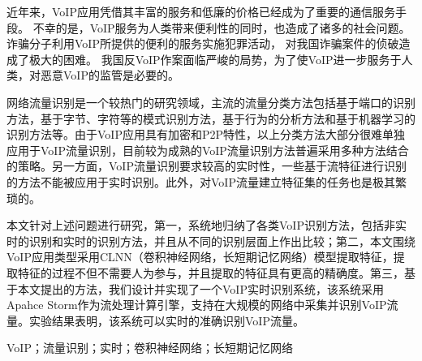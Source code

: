 
\begin{zhaiyao}
近年来，VoIP应用凭借其丰富的服务和低廉的价格已经成为了重要的通信服务手段。
不幸的是，VoIP服务为人类带来便利性的同时，也造成了诸多的社会问题。诈骗分子利用VoIP所提供的便利的服务实施犯罪活动，
对我国诈骗案件的侦破造成了极大的困难。
我国反VoIP作案面临严峻的局势，为了使VoIP进一步服务于人类，对恶意VoIP的监管是必要的。

网络流量识别是一个较热门的研究领域，主流的流量分类方法包括基于端口的识别方法，基于字节、字符等的模式识别方法，基于行为的分析方法和基于机器学习的识别方法等。由于VoIP应用具有加密和P2P特性，以上分类方法大部分很难单独应用于VoIP流量识别，目前较为成熟的VoIP流量识别方法普遍采用多种方法结合的策略。另一方面，VoIP流量识别要求较高的实时性，一些基于流特征进行识别的方法不能被应用于实时识别。此外，对VoIP流量建立特征集的任务也是极其繁琐的。

本文针对上述问题进行研究，第一，系统地归纳了各类VoIP识别方法，包括非实时的识别和实时的识别方法，并且从不同的识别层面上作出比较；第二，本文围绕VoIP应用类型采用CLNN（卷积神经网络，长短期记忆网络）模型提取特征，提取特征的过程不但不需要人为参与，并且提取的特征具有更高的精确度。第三，基于本文提出的方法，我们设计并实现了一个VoIP实时识别系统，该系统采用Apahce Storm作为流处理计算引擎，支持在大规模的网络中采集并识别VoIP流量。实验结果表明，该系统可以实时的准确识别VoIP流量。
\\
\end{zhaiyao}

\begin{flushleft}
\begin{guanjianci}
VoIP；流量识别；实时；卷积神经网络；长短期记忆网络
\end{guanjianci}
\end{flushleft}

